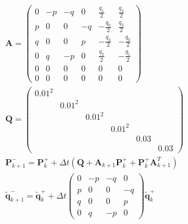 \begin{align}
  \boldsymbol{A} =
  \begin{pmatrix}
    0 & -p & -q & 0 & \frac{q_1}{2} & \frac{q_2}{2}\\
    p & 0 & 0 & -q & -\frac{q_0}{2} & \frac{q_3}{2}\\
    q & 0 & 0 & p & -\frac{q_3}{2} & -\frac{q_0}{2}\\
    0 & q & -p & 0 & \frac{q_2}{2} & -\frac{q_1}{2}\\
    0 & 0 & 0 & 0 & 0 & 0\\
    0 & 0 & 0 & 0 & 0 & 0
  \end{pmatrix}\\
  \boldsymbol{Q} =
  \begin{pmatrix}
    0.01^2\\
    & 0.01^2\\
    && 0.01^2\\
    &&& 0.01^2\\
    &&&& 0.03\\
    &&&&& 0.03
  \end{pmatrix}\\
  \boldsymbol{P}^{-}_{k+1} = \boldsymbol{P}^{+}_{k} + \Delta t \left(\boldsymbol{Q} + \boldsymbol{A}_{k+1} \boldsymbol{P}^{+}_{k} + \boldsymbol{P}^{+}_{k} \boldsymbol{A}_{k+1}^{T} \right)\\
  \tilde{\boldsymbol{q}}_{k+1}^{-} = \tilde{\boldsymbol{q}}_{k}^{+} +
  \Delta t
  \begin{pmatrix}
    0 & -p & -q & 0\\
    p & 0 & 0 & -q\\
    q & 0 & 0 & p\\
    0 & q & -p & 0
  \end{pmatrix}
  \tilde{\boldsymbol{q}}_{k}^{+}
\end{align}
